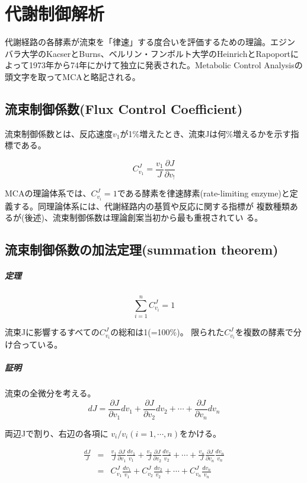 \chapter{代謝制御解析}
代謝経路の各酵素が流束を「律速」する度合いを評価するための理論。エジン
バラ大学のKacserとBurns、ベルリン・フンボルト大学のHeinrichとRapoportに
よって1973年から74年にかけて独立に発表された。Metabolic Control
Analysisの頭文字を取ってMCAと略記される。

\section{流束制御係数(Flux Control Coefficient)}
流束制御係数とは、反応速度\(v_1\)が1\%増えたとき、流束Jは何\%増えるかを示す指標である。

\[C^J_{v_1} = \frac{v_1}{J}\frac{\partial J}{\partial v_!}\]

MCAの理論体系では、\(C^J_{v_i}=1\)である酵素を律速酵素(rate-limiting
enzyme)と定義する。同理論体系には、代謝経路内の基質や反応に関する指標が
複数種類あるが(後述)、流束制御係数は理論創案当初から最も重視されてい
る。

\section{流束制御係数の加法定理(summation theorem)}
\paragraph{定理}

\[\sum_{i=1}^n C^J_{v_i}=1\]

流束Jに影響するすべての\(C^J_{v_i}\)の総和は1(=100\%)。 
限られた\(C^J_{v_i}\)を複数の酵素で分け合っている。

\paragraph{証明}
流束の全微分を考える。
\[dJ = \frac{\partial J}{\partial v_1}dv_1 + \frac{\partial J}{\partial v_2}dv_2 + \cdots + \frac{\partial J}{\partial v_n}dv_n  \]

両辺Jで割り、右辺の各項に \( v_i / v_i (i = 1, \cdots , n)\)をかける。

\begin{eqnarray*}
\frac{dJ} {J} & = & \frac{v_1}{J}\frac{\partial J}{\partial v_1}\frac{dv_1}{v_1} + \frac{v_2}{J}\frac{\partial J}{\partial v_2}\frac{dv_2}{v_2}  + \cdots + \frac{v_n}{J}\frac{\partial J}{\partial v_n}\frac{dv_n}{v_n} \\
 & = & C^J_{v_1}\frac{dv_1}{v_1} + C^J_{v_2}\frac{dv_2}{v_2} + \cdots + C^J_{v_n}\frac{dv_n}{v_n}
\end{eqnarray*}

